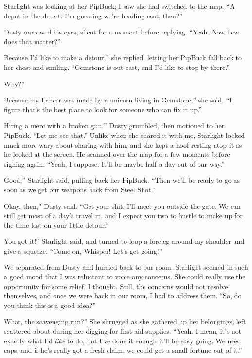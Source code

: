 Starlight was looking at her PipBuck; I saw she had switched to the map. “A depot in the desert. I’m guessing we’re heading east, then?”

Dusty narrowed his eyes, silent for a moment before replying. “Yeah. Now how does that matter?”

\leavevmode{}Because I’d like to make a detour,” she replied, letting her PipBuck fall back to her chest and smiling. “Gemstone is out east, and I’d like to stop by there.”

\leavevmode{}Why?”

\leavevmode{}Because my Lancer was made by a unicorn living in Gemstone,” she said. “I figure that’s the best place to look for someone who can fix it up.”

\leavevmode{}Hiring a merc with a broken gun,” Dusty grumbled, then motioned to her PipBuck. “Let me see that.” Unlike when she shared it with me, Starlight looked much more wary about sharing with him, and she kept a hoof resting atop it as he looked at the screen. He scanned over the map for a few moments before sighing again. “Yeah, I suppose. It’ll be maybe half a day out of our way.”

\leavevmode{}Good,” Starlight said, pulling back her PipBuck. “Then we’ll be ready to go as soon as we get our weapons back from Steel Shot.”

\leavevmode{}Okay, then,” Dusty said. “Get your shit. I’ll meet you outside the gate. We can still get most of a day’s travel in, and I expect you two to hustle to make up for the time lost on your little detour.”

\leavevmode{}You got it!” Starlight said, and turned to loop a foreleg around my shoulder and give a squeeze. “Come on, Whisper! Let’s get going!”

We separated from Dusty and hurried back to our room. Starlight seemed in such a good mood that I was reluctant to voice any concerns. She could really use the opportunity for some relief, I thought. Still, the concerns would not resolve themselves, and once we were back in our room, I had to address them. “So, do you think this is a good idea?”

\leavevmode{}What, the scavenging run?” She shrugged as she gathered up her belongings, left scattered about during her digging for first-aid supplies. “Yeah. I mean, it’s not exactly what I’d \textit{like} to do, but I’ve done it enough it’ll be easy going. We need caps, and if he’s really got a fresh claim, we could get a small fortune out of it.”


